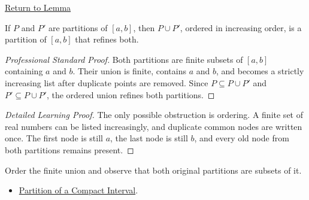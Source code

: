 \newpage
{}
\label{prf:common-refinement-partitions}

\begin{remark*}[Return]
\hyperref[lem:common-refinement-partitions]{Return to Lemma}
\end{remark*}

\begin{lemma*}
If \(P\) and \(P'\) are partitions of \([a,b]\), then \(P\cup P'\), ordered
in increasing order, is a partition of \([a,b]\) that refines both.
\end{lemma*}

\begin{proof}[Professional Standard Proof]
\LRAProofBodyStart
Both partitions are finite subsets of \([a,b]\) containing \(a\) and \(b\).
Their union is finite, contains \(a\) and \(b\), and becomes a strictly
increasing list after duplicate points are removed. Since \(P\subseteq P\cup
P'\) and \(P'\subseteq P\cup P'\), the ordered union refines both partitions.
\end{proof}

\begin{proof}[Detailed Learning Proof]
\LRAProofBodyStart
The only possible obstruction is ordering. A finite set of real numbers can be
listed increasingly, and duplicate common nodes are written once. The first
node is still \(a\), the last node is still \(b\), and every old node from both
partitions remains present.
\end{proof}

\begin{remark*}
Order the finite union and observe that both original partitions are subsets
of it.
\end{remark*}

\begin{dependencies}
\begin{itemize}
  \item \hyperref[def:integration-partition]{Partition of a Compact Interval}.
\end{itemize}
\end{dependencies}

\clearpage
